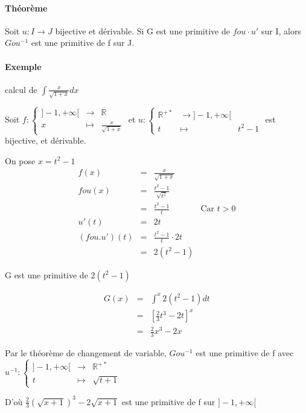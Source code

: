 \paragraph{Théorème} Soit $u:I \rightarrow J$ bijective et dérivable. Si G est une primitive de $fou\cdot u'$ sur I, alors $Gou^{-1}$ est une primitive de f sur J.

\paragraph{Exemple} calcul de $\int\frac{x}{\sqrt{1+x}}dx$

Soit $f:\left\{\begin{array}{rcl}
 ]-1, +\infty[ &\rightarrow& \mathbb{R} \\
x &\mapsto& \frac{x}{\sqrt{1+x}}\end{array}\right.$
		et $u : \left\{\begin{array}{rcl}
\mathbb{R}^{+*} & \rightarrow ]-1, +\infty[ \\
t &\mapsto& t^2 -1\end{array}\right.$ est bijective, et dérivable.

On pose $x = t^2 - 1$ \[\begin{array}{rclr}
	f(x) &=& \frac{x}{\sqrt{1+x}} \\
	fou(x) &=& \frac{t^2 - 1}{\sqrt{t^2}} \\
		&=& \frac{t^2 - 1}{t} & \text{Car } t > 0 \\
	u'(t) &=& 2t \\
(fou.u')(t) &=& \frac{t^2 -1}{t}\cdot 2t \\
			&=& 2(t^2-1)
\end{array}\]

G est une primitive de $2(t^2 - 1)$ 

\[\begin{array}{rcl}
	G(x) &=& \int^x 2(t^2-1)dt \\
&=& [\frac{2}{3}t^3 - 2t]^x \\
&=& \frac{2}{3}x^3 - 2x\end{array}\]

		Par le théorème de changement de variable, $Gou^{-1}$ est une primitive de f avec $u^{-1} : \left\{ \begin{array}{rcl}
																						]-1, +\infty[ &\rightarrow& \mathbb{R}^{+*} \\
																									t &\mapsto& \sqrt{t+1}\end{array}\right.$

D'où $\frac{2}{3}(\sqrt{x+1})^3 - 2\sqrt{x+1}$ est une primitive de f sur $]-1, +\infty[$

